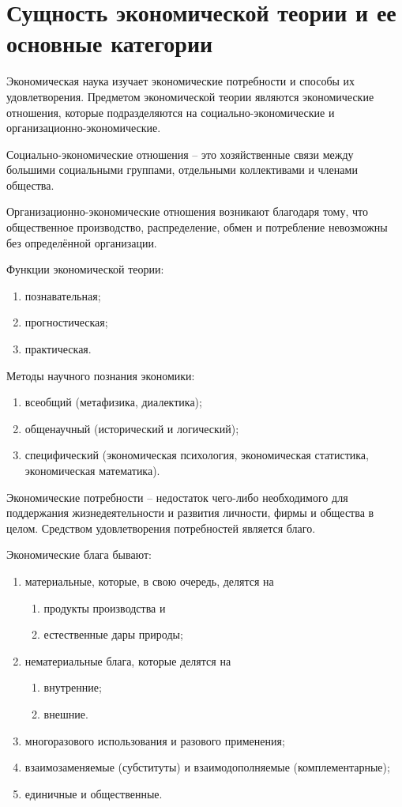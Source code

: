 \section{Сущность экономической теории и ее основные категории}

Экономическая наука изучает экономические потребности и способы их
удовлетворения. Предметом экономической теории являются экономические отношения,
которые подразделяются на социально-экономические и организационно-экономические.

Социально-экономические отношения -- это хозяйственные связи между большими
социальными группами, отдельными коллективами и членами общества.

Организационно-экономические отношения возникают благодаря тому, что
общественное производство, распределение, обмен и потребление невозможны без
определённой организации.

Функции экономической теории:
\begin{enumerate}
    \item познавательная;
    \item прогностическая;
    \item практическая.
\end{enumerate}

Методы научного познания экономики:
\begin{enumerate}
    \item всеобщий (метафизика, диалектика);
    \item общенаучный (исторический и логический);
    \item специфический (экономическая психология, экономическая статистика,
    экономическая математика).
\end{enumerate}

Экономические потребности -- недостаток чего-либо необходимого для поддержания
жизнедеятельности и развития личности, фирмы и общества в целом. Средством
удовлетворения потребностей является благо.

Экономические блага бывают:
\begin{enumerate}
    \item материальные, которые, в свою очередь, делятся на
    \begin{enumerate}
        \item продукты производства и
        \item естественные дары природы;
    \end{enumerate}
    \item нематериальные блага, которые делятся на
    \begin{enumerate}
        \item внутренние;
        \item внешние.
    \end{enumerate}
    \item многоразового использования и разового применения;
    \item взаимозаменяемые (субституты) и взаимодополняемые (комплементарные);
    \item единичные и общественные.
\end{enumerate}

